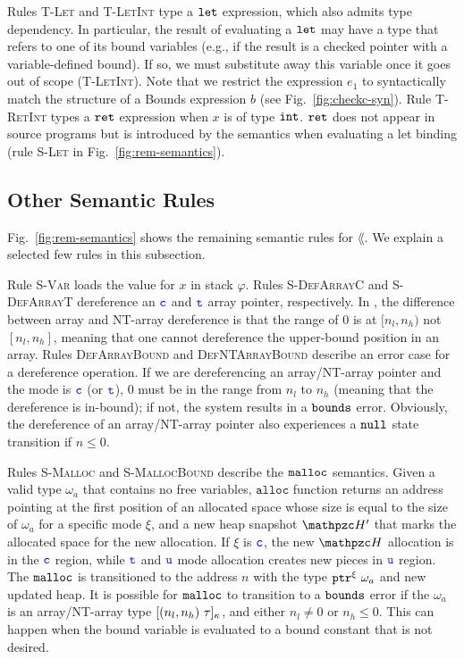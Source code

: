 %
Rules \textsc{T-Let} and \textsc{T-LetInt} type a $\mathtt{let}$ expression, which also admits
type dependency. 
In particular, the result of evaluating a $\mathtt{let}$
may have a type that refers to one of its bound variables (e.g., if
the result is a checked pointer with a variable-defined bound). If so, we must substitute away this variable once it goes out of scope (\textsc{T-LetInt}). 
Note that we restrict the expression $e_1$ to syntactically match the
structure of a Bounds expression $b$ (see Fig.~\ref{fig:checkc-syn}).
Rule \textsc{T-RetInt} types a $\mathtt{ret}$ expression when $x$ is of type $\mathtt{int}$.
$\mathtt{ret}$ does not appear in source programs but is introduced by the semantics when
evaluating a let binding (rule \textsc{S-Let} in
Fig.~\ref{fig:rem-semantics}). 

\subsection{Other Semantic Rules}\label{sec:rem-semantics}

Fig.~\ref{fig:rem-semantics} shows the remaining semantic rules for
$\lang$. We explain a selected few rules in this subsection.

Rule \textsc{S-Var} loads the value for $x$ in stack $\varphi$.
Rules \textsc{S-DefArrayC} and \textsc{S-DefArrayT} dereference an $\textcolor{blue}{\texttt{c}}$ and $\textcolor{blue}{\texttt{t}}$ array pointer, respectively.
In \lang, the difference between array and NT-array dereference is that the range of $0$ is at $[n_l,n_h)$ not $[n_l,n_h]$, meaning that one cannot dereference the upper-bound position in an array.
Rules \textsc{DefArrayBound} and \textsc{DefNTArrayBound} describe an error case for a dereference operation.
If we are dereferencing an array/NT-array pointer and the mode is $\textcolor{blue}{\texttt{c}}$ (or $\textcolor{blue}{\texttt{t}}$), $0$ must be in the range from $n_l$ to $n_h$ (meaning that the dereference is in-bound); if not, the system results in a $\mathtt{bounds}$ error. Obviously, the dereference of an array/NT-array pointer also experiences a $\mathtt{null}$ state transition if $n\le 0$.

Rules \textsc{S-Malloc} and \textsc{S-MallocBound} describe the $\mathtt{malloc}$ semantics. Given a valid type $\omega_a$ that contains no free variables, $\mathtt{alloc}$ function returns an address pointing at the first position of an allocated space whose size is equal to the size of $\omega_a$ for a specific mode $\xi$, 
and a new heap snapshot $\heap'$ that marks the allocated space for the new allocation. 
If $\xi$ is $\textcolor{blue}{\texttt{c}}$, the new $\heap$ allocation is in the $\textcolor{blue}{\texttt{c}}$ region, while $\textcolor{blue}{\texttt{t}}$ and $\textcolor{blue}{\texttt{u}}$ mode allocation creates new pieces in $\textcolor{blue}{\texttt{u}}$ region.
The $\mathtt{malloc}$ is transitioned to the address $n$ with the type ${\mathtt{ptr}^{\xi}~{\omega_a}}$ and new updated heap. It is possible for $\mathtt{malloc}$ to transition to a $\mathtt{bounds}$ error if the $\omega_a$ is an array/NT-array type $[{({n_l},{n_h})}~{\tau}]_{\kappa}$, and either $n_l \neq 0$ or $n_h \le 0$. This can happen when the bound variable is evaluated to a bound constant that is not desired. 

